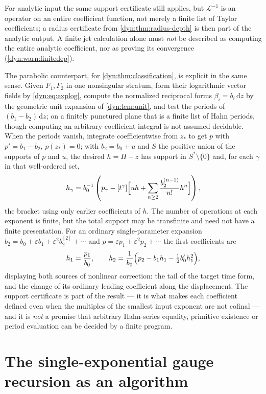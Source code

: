\documentclass[11pt,letterpaper]{article}
\theoremstyle{definition}
\theoremstyle{remark}
\newcommand{\Li}{\mathcal L}
\newcommand{\eps}{\varepsilon}
\newcommand{\dd}{\,\mathrm d}
\numberwithin{equation}{section}
\begin{document}
For analytic input the same support certificate still applies, but
$\Li^{-1}$ is an operator on an entire coefficient function, not merely a
finite list of Taylor coefficients; a radius certificate from
\cref{dyn:thm:radius-depth} is then part of the analytic output. A finite
jet calculation alone must \emph{not} be described as computing the entire
analytic coefficient, nor as proving its convergence
(\cref{dyn:warn:finitedep}).

The parabolic counterpart, for \cref{dyn:thm:classification}, is
explicit in the same sense. Given $F_1,F_2$ in one nonsingular stratum,
form their logarithmic vector fields by \eqref{dyn:eq:explog}, compute the
normalized reciprocal forms $\beta_i=b_i\dd z$ by the geometric unit
expansion of \cref{dyn:lem:unit}, and test the periods of
$(b_1-b_2)\dd z$; on a finitely punctured plane that is a finite list of
Hahn periods, though computing an arbitrary coefficient integral is not
assumed decidable. When the periods vanish, integrate coefficientwise from
$z_{*}$ to get $p$ with $p'=b_1-b_2$, $p(z_{*})=0$; with $b_2=b_0+u$ and
$S$ the positive union of the supports of $p$ and $u$, the desired
$h=H-z$ has support in $S^{*}\setminus\{0\}$ and, for each $\gamma$ in that
well-ordered set,
\begin{equation}\label{dyn:eq:explicit-recursion}
 h_\gamma=b_0^{-1}\left(p_\gamma-[t^{\gamma}]
 \Bigl[uh+\sum_{n\ge2}\frac{b_2^{(n-1)}}{n!}h^{n}\Bigr]\right),
\end{equation}
the bracket using only earlier coefficients of $h$. The number of
operations at each exponent is finite, but the total support may be
transfinite and need not have a finite presentation. For an ordinary
single-parameter expansion $b_2=b_0+\eps b_1+\eps^{2}b_2^{[2]}+\cdots$ and
$p=\eps p_1+\eps^{2}p_2+\cdots$ the first coefficients are
\[
 h_1=\frac{p_1}{b_0},\qquad
 h_2=\frac1{b_0}\Bigl(p_2-b_1h_1-\tfrac12b_0'h_1^{2}\Bigr),
\]
displaying both sources of nonlinear correction: the tail of the target
time form, and the change of its ordinary leading coefficient along the
displacement. The support certificate is part of the result --- it is what
makes each coefficient defined even when the multiples of the smallest
input exponent are not cofinal --- and it is \emph{not} a promise that
arbitrary Hahn-series equality, primitive existence or period evaluation
can be decided by a finite program.

\section{The single-exponential gauge recursion as an algorithm}
\label{dyn:app:algorithm}
\end{document}
